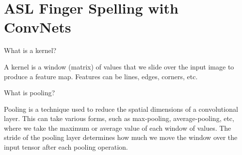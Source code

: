 \section{ASL Finger Spelling with ConvNets}

            







\begin{problem}
  What is a kernel?
  \begin{answer}
    A kernel is a window (matrix) of values that we
    slide over the input image to produce a feature map.
    Features can be lines, edges, corners, etc.
  \end{answer}
\end{problem}

\begin{problem}
  What is pooling?
  \begin{answer}
    Pooling is a technique used to reduce the spatial dimensions of a convolutional layer.
    This can take various forms, such as max-pooling, average-pooling, etc,
    where we take the maximum or average value of each window of values.
    The stride of the pooling layer determines how much we move the window
    over the input tensor after each pooling operation.
  \end{answer}
\end{problem}


